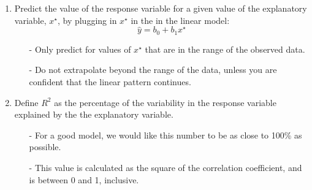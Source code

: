\documentclass[11pt]{article}
\begin{document}
\begin{enumerate}[resume]
\item Predict the value of the response variable for a given value of the explanatory variable, $x^\star$, by plugging in $x^\star$ in the in the linear model:
\[ \hat{y} = b_0 + b_1 x^\star \]
\begin{itemize}
\item[-] Only predict for values of $x^\star$ that are in the range of the observed data.
\item[-] Do not extrapolate beyond the range of the data, unless you are confident that the linear pattern continues.
\end{itemize}

\item Define $R^2$ as the percentage of the variability in the response variable explained by the the explanatory variable.
\begin{itemize}
\item[-] For a good model, we would like this number to be as close to 100\% as possible.
\item[-] This value is calculated as the square of the correlation coefficient, and is between 0 and 1, inclusive.
\end{itemize}

\end{enumerate}
\end{document}

